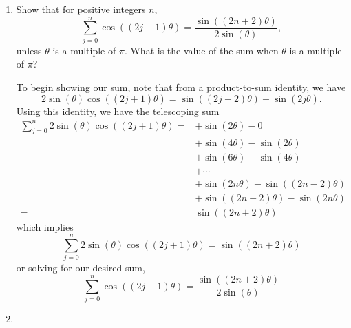 \documentclass[a4paper,12pt]{article}
\begin{document}
\begin{enumerate}[label = \arabic*.]
\begin{enumerate}[label = (\roman*)]
				\item Show that for positive integers $ n $, 
				\[
					\sum_{j = 0}^{n} \cos((2j + 1) \theta) = \frac{\sin((2n + 2) \theta)}{2 \sin(\theta)},
				\]
				unless $ \theta $ is a multiple of $ \pi $. What is the value of the sum when $ \theta $ is a multiple of $ \pi $?
				
				To begin showing our sum, note that from a product-to-sum identity, we have
				\[
					2 \sin(\theta)\cos((2j + 1) \theta) = \sin((2j + 2) \theta) - \sin(2j \theta).
				\]
				Using this identity, we have the telescoping sum
				\begin{align*}
					\sum_{j = 0}^{n} 2 \sin(\theta) \cos((2j + 1)\theta)  =& +\sin(2 \theta) - 0 \\[-0.5cm]
					& + \sin(4\theta) - \sin(2\theta) \\
					& + \sin(6\theta) - \sin(4\theta) \\
					& + \cdots \\
					& + \sin(2n\theta) - \sin((2n - 2)\theta) \\
					& + \sin((2n + 2)\theta) - \sin(2n\theta) \\
					=& \sin((2n + 2)\theta)
				\end{align*}
				which implies
				\[
					\sum_{j = 0}^{n} 2 \sin(\theta) \cos((2j + 1)\theta) = \sin((2n + 2)\theta)
				\]
				or solving for our desired sum,
				\[
					\sum_{j = 0}^{n} \cos((2j + 1)\theta) = \frac{\sin((2n + 2)\theta)}{2 \sin(\theta)}
				\]
				
				\item 
			\end{enumerate}
\end{enumerate}
\end{document}
